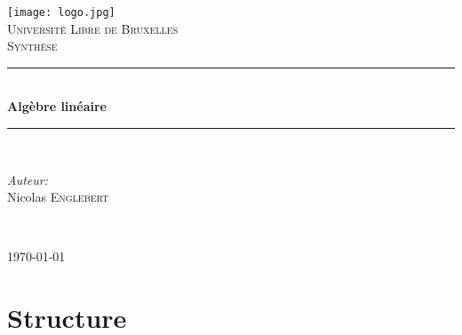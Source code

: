 \documentclass[12pt, a4paper, openany]{article}
\begin{document}
\setlength{\fboxsep}{3 mm } %

\renewcommand{\proofname}{Démonstration}
\newcommand{\pscal}[2]{\left\langle {#1} , {#2} \right\rangle} 
\begin{titlepage}
\begin{center}	
	
	\newcommand{\HRule}{\rule{\linewidth}{0.5mm}}   			%
	\texttt{[image: logo.jpg]}~\\[1cm]				%

	\textsc{\LARGE Université Libre de Bruxelles}\\[1.5cm]
	\textsc{\Large Synthèse}\\[0.5cm]

	\HRule \\[0.4cm]
	{ \huge \bfseries Algèbre linéaire \\[0.4cm] }


	\HRule \\[1.5cm]
		\begin{minipage}{0.4\textwidth}
		\begin{flushleft} \large
		
		\emph{Auteur:}\\
			Nicolas \textsc{Englebert}\\
			\end{flushleft}
			\end{minipage}
			\begin{minipage}{0.4\textwidth}
			\begin{flushright} \large
			\emph{} \\		
			\textsc{}
			\end{flushright}
		\end{minipage}

	\vfill

{\large \today}

\end{center}
\end{titlepage}

\section{Structure}
\end{document}
